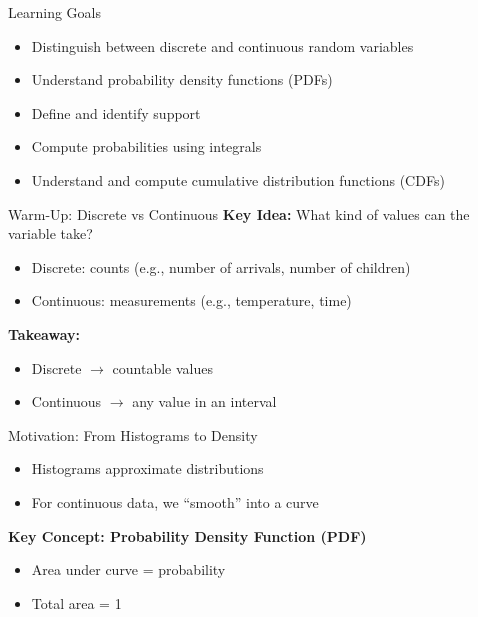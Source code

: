 \documentclass[dvipsnames]{beamer}
\newcommand{\transition}[1]{\frame{{}\begin{center}\fbox{#1}\end{center}}}
\begin{document}
\transition{Content}





\begin{frame}{Learning Goals}
\begin{itemize}
    \item Distinguish between discrete and continuous random variables
    \item Understand probability density functions (PDFs)
    \item Define and identify support
    \item Compute probabilities using integrals
    \item Understand and compute cumulative distribution functions (CDFs)
\end{itemize}
\end{frame}


\begin{frame}{Warm-Up: Discrete vs Continuous}
\textbf{Key Idea:} What kind of values can the variable take?

\begin{itemize}
    \item Discrete: counts (e.g., number of arrivals, number of children)
    \item Continuous: measurements (e.g., temperature, time)
\end{itemize}

\textbf{Takeaway:}
\begin{itemize}
    \item Discrete $\rightarrow$ countable values
    \item Continuous $\rightarrow$ any value in an interval
\end{itemize}
\end{frame}


\begin{frame}{Motivation: From Histograms to Density}
\begin{itemize}
    \item Histograms approximate distributions
    \item For continuous data, we “smooth” into a curve
\end{itemize}

\textbf{Key Concept: Probability Density Function (PDF)}
\begin{itemize}
    \item Area under curve = probability
    \item Total area = 1
\end{itemize}
\end{frame}
\end{document}

